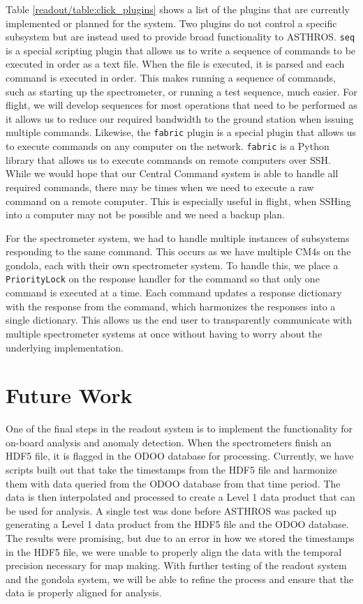Table \ref{readout/table:click_plugins} shows a list of the plugins that are currently implemented or planned for the system.
Two plugins do not control a specific subsystem but are instead used to provide broad functionality to ASTHROS.
\texttt{seq} is a special scripting plugin that allows us to write a sequence of commands to be executed in order as a text file. 
When the file is executed, it is parsed and each command is executed in order.
This makes running a sequence of commands, such as starting up the spectrometer, or running a test sequence, much easier.
For flight, we will develop sequences for most operations that need to be performed as it allows us to reduce our required bandwidth to the ground station when issuing multiple commands. 
Likewise, the \texttt{fabric} plugin is a special plugin that allows us to execute commands on any computer on the network.
\texttt{fabric} is a Python library that allows us to execute commands on remote computers over SSH. 
While we would hope that our Central Command system is able to handle all required commands, there may be times when we need to execute a raw command on a remote computer.
This is especially useful in flight, when SSHing into a computer may not be possible and we need a backup plan.

For the spectrometer system, we had to handle multiple instances of subsystems responding to the same command.
This occurs as we have multiple CM4s on the gondola, each with their own spectrometer system.
To handle this, we place a \texttt{PriorityLock} on the response handler for the command so that only one command is executed at a time.
Each command updates a response dictionary with the response from the command, which harmonizes the responses into a single dictionary.
This allows us the end user to transparently communicate with multiple spectrometer systems at once without having to worry about the underlying implementation.

\section{Future Work}
One of the final steps in the readout system is to implement the functionality for on-board analysis and anomaly detection.
When the spectrometers finish an HDF5 file, it is flagged in the ODOO database for processing.
Currently, we have scripts built out that take the timestamps from the HDF5 file and harmonize them with data queried from the ODOO database from that time period.
The data is then interpolated and processed to create a Level 1 data product that can be used for analysis.
A single test was done before ASTHROS was packed up generating a Level 1 data product from the HDF5 file and the ODOO database.
The results were promising, but due to an error in how we stored the timestamps in the HDF5 file, we were unable to properly align the data with the temporal precision necessary for map making.
With further testing of the readout system and the gondola system, we will be able to refine the process and ensure that the data is properly aligned for analysis.


